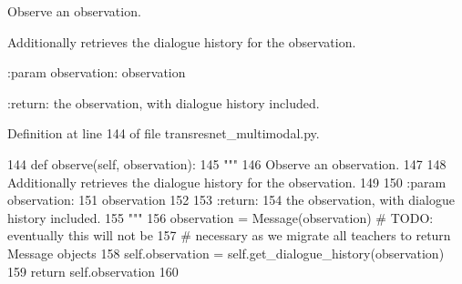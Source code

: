 \begin{DoxyVerb}Observe an observation.

Additionally retrieves the dialogue history for the observation.

:param observation:
    observation

:return:
    the observation, with dialogue history included.
\end{DoxyVerb}
 

Definition at line 144 of file transresnet\+\_\+multimodal.\+py.


\begin{DoxyCode}
144     \textcolor{keyword}{def }observe(self, observation):
145         \textcolor{stringliteral}{"""}
146 \textcolor{stringliteral}{        Observe an observation.}
147 \textcolor{stringliteral}{}
148 \textcolor{stringliteral}{        Additionally retrieves the dialogue history for the observation.}
149 \textcolor{stringliteral}{}
150 \textcolor{stringliteral}{        :param observation:}
151 \textcolor{stringliteral}{            observation}
152 \textcolor{stringliteral}{}
153 \textcolor{stringliteral}{        :return:}
154 \textcolor{stringliteral}{            the observation, with dialogue history included.}
155 \textcolor{stringliteral}{        """}
156         observation = Message(observation)  \textcolor{comment}{# TODO: eventually this will not be}
157         \textcolor{comment}{# necessary as we migrate all teachers to return Message objects}
158         self.observation = self.get\_dialogue\_history(observation)
159         \textcolor{keywordflow}{return} self.observation
160 
\end{DoxyCode}
\mbox{\label{classprojects_1_1image__chat_1_1transresnet__multimodal_1_1transresnet__multimodal_1_1TransresnetMultimodalAgent_a912122759d9ade4a11ddd1a5b5961069}} 
